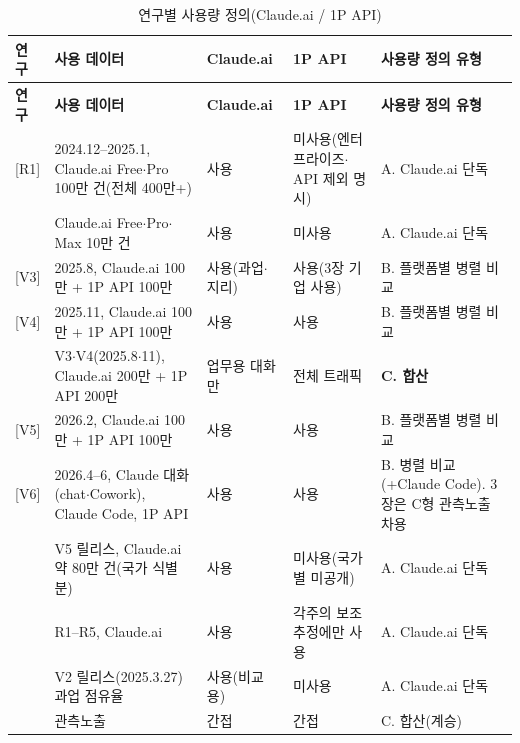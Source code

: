 \documentclass[11pt]{article}
\begin{document}
\begin{longtable}{L{3.4cm}L{4.2cm}L{2.2cm}L{2.6cm}L{3.4cm}}
\caption{연구별 사용량 정의(Claude.ai / 1P API)}\label{tab:studies}\\
\toprule
\textbf{연구} & \textbf{사용 데이터} & \textbf{Claude.ai} & \textbf{1P API} & \textbf{사용량 정의 유형}\\
\midrule
\endfirsthead
\toprule
\textbf{연구} & \textbf{사용 데이터} & \textbf{Claude.ai} & \textbf{1P API} & \textbf{사용량 정의 유형}\\
\midrule
\endhead
\bottomrule
\endfoot
\textcite{handa-2025-which-economic-tasks-are} [R1] & 2024.12--2025.1, Claude.ai Free$\cdot$Pro 100만 건(전체 400만+) & 사용 & 미사용(엔터프라이즈$\cdot$API 제외 명시) & A. Claude.ai 단독\\
\textcite{tamkin-2025-estimating-ai-productivity-gains-from} & Claude.ai Free$\cdot$Pro$\cdot$Max 10만 건 & 사용 & 미사용 & A. Claude.ai 단독\\
\textcite{appel-2025-uneven-geographic-and-enterprise-ai} [V3] & 2025.8, Claude.ai 100만 + 1P API 100만 & 사용(과업$\cdot$지리) & 사용(3장 기업 사용) & B. 플랫폼별 병렬 비교\\
\textcite{appel-2026-economic-primitives} [V4] & 2025.11, Claude.ai 100만 + 1P API 100만 & 사용 & 사용 & B. 플랫폼별 병렬 비교\\
\textcite{massenkoff-2026-labor-market-impacts-of-ai} & V3$\cdot$V4(2025.8$\cdot$11), Claude.ai 200만 + 1P API 200만 & 업무용 대화만 & 전체 트래픽 & \textbf{C. 합산}\\
\textcite{massenkoff-2026-learning-curves} [V5] & 2026.2, Claude.ai 100만 + 1P API 100만 & 사용 & 사용 & B. 플랫폼별 병렬 비교\\
\textcite{massenkoff-2026-cadences} [V6] & 2026.4--6, Claude 대화(chat$\cdot$Cowork), Claude Code, 1P API & 사용 & 사용 & B. 병렬 비교(+Claude Code). 3장은 C형 관측노출 차용\\
\textcite{fan-2026-what-countries-use-ai-and} & V5 릴리스, Claude.ai 약 80만 건(국가 식별분) & 사용 & 미사용(국가별 미공개) & A. Claude.ai 단독\\
\textcite{fan-2026-aggregate-gains-from-ai} & R1--R5, Claude.ai & 사용 & 각주의 보조 추정에만 사용 & A. Claude.ai 단독\\
\textcite{bick-2026-what-work-does-generative} & V2 릴리스(2025.3.27) 과업 점유율 & 사용(비교용) & 미사용 & A. Claude.ai 단독\\
\textcite{kim-2026-generative-ai-korean-labor-market} & \textcite{massenkoff-2026-labor-market-impacts-of-ai} 관측노출 & 간접 & 간접 & C. 합산(계승)\\
\end{longtable}
\end{document}
